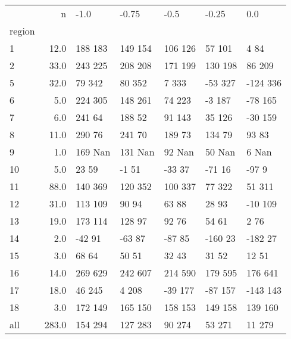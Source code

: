 \begin{tabular}{lrlllll}
\toprule
{} &      n &     -1.0 &    -0.75 &     -0.5 &    -0.25 &       0.0 \\
region &        &          &          &          &          &           \\
\midrule
1      &   12.0 &  188 183 &  149 154 &  106 126 &   57 101 &      4 84 \\
2      &   33.0 &  243 225 &  208 208 &  171 199 &  130 198 &    86 209 \\
5      &   32.0 &   79 342 &   80 352 &    7 333 &  -53 327 &  -124 336 \\
6      &    5.0 &  224 305 &  148 261 &   74 223 &   -3 187 &   -78 165 \\
7      &    6.0 &   241 64 &   188 52 &   91 143 &   35 126 &   -30 159 \\
8      &   11.0 &   290 76 &   241 70 &   189 73 &   134 79 &     93 83 \\
9      &    1.0 &  169 Nan &  131 Nan &   92 Nan &   50 Nan &     6 Nan \\
10     &    5.0 &    23 59 &    -1 51 &   -33 37 &   -71 16 &     -97 9 \\
11     &   88.0 &  140 369 &  120 352 &  100 337 &   77 322 &    51 311 \\
12     &   31.0 &  113 109 &    90 94 &    63 88 &    28 93 &   -10 109 \\
13     &   19.0 &  173 114 &   128 97 &    92 76 &    54 61 &      2 76 \\
14     &    2.0 &   -42 91 &   -63 87 &   -87 85 &  -160 23 &   -182 27 \\
15     &    3.0 &    68 64 &    50 51 &    32 43 &    31 52 &     12 51 \\
16     &   14.0 &  269 629 &  242 607 &  214 590 &  179 595 &   176 641 \\
17     &   18.0 &   46 245 &    4 208 &  -39 177 &  -87 157 &  -143 143 \\
18     &    3.0 &  172 149 &  165 150 &  158 153 &  149 158 &   139 160 \\
all    &  283.0 &  154 294 &  127 283 &   90 274 &   53 271 &    11 279 \\
\bottomrule
\end{tabular}

